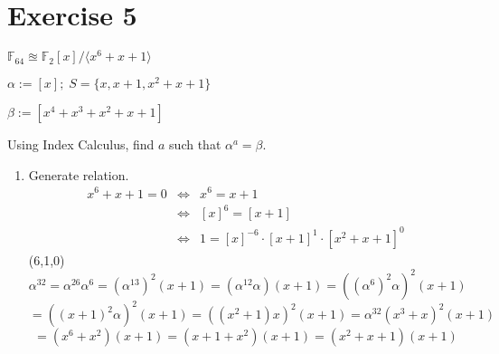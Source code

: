 \documentclass[a4paper]{scrreprt}
\newcommand\F{\mathbb F}
\begin{document}
\section*{Exercise 5}

$\F_{64} \approxeq \F_2[x]/\langle x^6+x+1\rangle$

$\alpha:=[x];\;S=\{x, x+1, x^2+x+1\}$

$\beta:=[x^4+x^3+x^2+x+1]$

Using Index Calculus, find $a$ such that $\alpha^a=\beta$.

\begin{enumerate}
    \item Generate relation.
        \begin{eqnarray*}
            x^6+x+1=0&\Leftrightarrow&x^6=x+1\\
                     &\Leftrightarrow& [x]^6=[x+1]\\
                     &\Leftrightarrow& 1=[x]^{-6}\cdot[x+1]^1\cdot[x^2+x+1]^0
        \end{eqnarray*}
        (6,1,0)
        \[\alpha^{32} = \alpha^{26}\alpha^6 = (\alpha^{13})^2(x+1)
        = (\alpha^{12}\alpha)(x+1)=((\alpha^6)^2\alpha)^2(x+1)\]
        \[=((x+1)^2\alpha)^2(x+1) = ((x^2+1)x)^2(x+1)
        =\alpha^{32}(x^3+x)^2(x+1)\]
        \[=(x^6+x^2)(x+1)=(x+1+x^2)(x+1)=(x^2+x+1)(x+1)\]


\end{enumerate}
\end{document}
